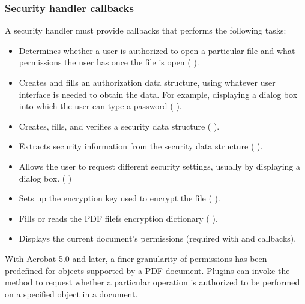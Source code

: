 \documentclass[letterpaper,12pt,english,openany,oneside]{sphinxmanual}
\begin{document}
\subsubsection{Security handler callbacks}
\label{\detokenize{Plugins_Security:security-handler-callbacks}}
A security handler must provide callbacks that performs the following tasks:
\begin{itemize}
\item {} 
Determines whether a user is authorized to open a particular file and what permissions the user has once the file is open ( ).

\item {} 
Creates and fills an authorization data structure, using whatever user interface is needed to obtain the data. For example, displaying a dialog box into which the user can type a password ( ).

\item {} 
Creates, fills, and verifies a security data structure ( ).

\item {} 
Extracts security information from the security data structure ( ).

\item {} 
Allows the user to request different security settings, usually by displaying a dialog box. ( )

\item {} 
Sets up the encryption key used to encrypt the file ( ).

\item {} 
Fills or reads the PDF filefs encryption dictionary ( ).

\item {} 
Displays the current document’s permissions (required with  and  callbacks).

\end{itemize}

With Acrobat 5.0 and later, a finer granularity of permissions has been predefined for objects supported by a PDF document. Plugins can invoke the  method to request whether a particular operation is authorized to be performed on a specified object in a document.
\end{document}
